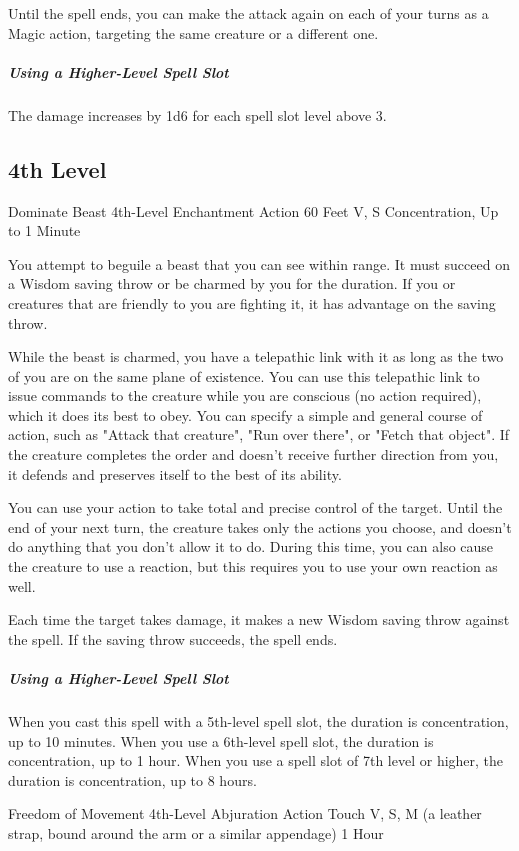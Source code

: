 \documentclass[letterpaper,openany,oneside,twocolumn]{book}
\begin{document}
Until the spell ends, you can make the attack again on each of your turns as a Magic action, targeting the same creature or a different one.

\subparagraph*{Using a Higher-Level Spell Slot} The damage increases by 1d6 for each spell slot level above 3.

\subsection*{4th Level}

\DndSpellHeader
  {Dominate Beast}
  {4th-Level Enchantment}
  {Action}
  {60 Feet}
  {V, S}
  {Concentration, Up to 1 Minute}

You attempt to beguile a beast that you can see within range. It must succeed on a Wisdom saving throw or be charmed by you for the duration. If you or creatures that are friendly to you are fighting it, it has advantage on the saving throw.

While the beast is charmed, you have a telepathic link with it as long as the two of you are on the same plane of existence. You can use this telepathic link to issue commands to the creature while you are conscious (no action required), which it does its best to obey. You can specify a simple and general course of action, such as "Attack that creature", "Run over there", or "Fetch that object". If the creature completes the order and doesn't receive further direction from you, it defends and preserves itself to the best of its ability.

You can use your action to take total and precise control of the target. Until the end of your next turn, the creature takes only the actions you choose, and doesn't do anything that you don't allow it to do. During this time, you can also cause the creature to use a reaction, but this requires you to use your own reaction as well.

Each time the target takes damage, it makes a new Wisdom saving throw against the spell. If the saving throw succeeds, the spell ends.

\subparagraph*{Using a Higher-Level Spell Slot} When you cast this spell with a 5th-level spell slot, the duration is concentration, up to 10 minutes. When you use a 6th-level spell slot, the duration is concentration, up to 1 hour. When you use a spell slot of 7th level or higher, the duration is concentration, up to 8 hours.

\DndSpellHeader
  {Freedom of Movement}
  {4th-Level Abjuration}
  {Action}
  {Touch}
  {V, S, M (a leather strap, bound around the arm or a similar appendage)}
  {1 Hour}
  
\end{document}
